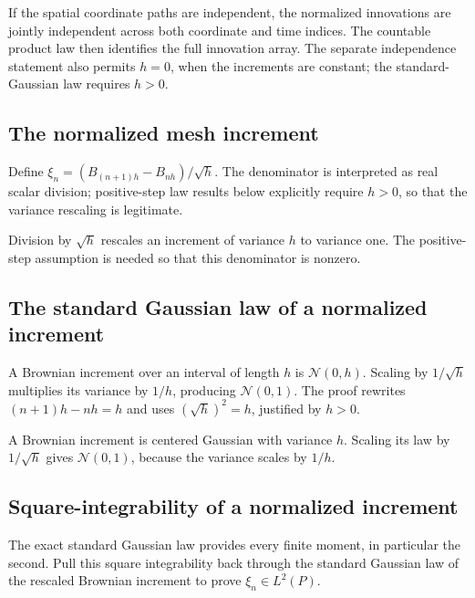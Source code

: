 \documentclass[11pt,a4paper]{report}
\begin{document}
If the spatial coordinate paths are independent, the normalized innovations are jointly independent across both coordinate and time indices. The countable product law then identifies the full innovation array. The separate independence statement also permits \(h=0\), when the increments are constant; the standard-Gaussian law requires \(h>0\).

\subsection{\texorpdfstring{The normalized mesh increment}{The normalized mesh increment}}
\label{report-step-UnadjustedLangevin-BrownianInnovations-lean-1}


Define \(\xi_n=(B_{(n+1)h}-B_{nh})/\sqrt h\). The denominator is interpreted as real scalar division; positive-step law results below explicitly require \(h>0\), so that the variance rescaling is legitimate.



Division by \(\sqrt h\) rescales an increment of variance \(h\) to variance one. The positive-step assumption is needed so that this denominator is nonzero.

\subsection{\texorpdfstring{The standard Gaussian law of a normalized increment}{The standard Gaussian law of a normalized increment}}
\label{report-step-UnadjustedLangevin-BrownianInnovations-lean-2}


A Brownian increment over an interval of length \(h\) is \(\mathcal N(0,h)\). Scaling by \(1/\sqrt h\) multiplies its variance by \(1/h\), producing \(\mathcal N(0,1)\). The proof rewrites \((n+1)h-nh=h\) and uses \((\sqrt h)^2=h\), justified by \(h>0\).



A Brownian increment is centered Gaussian with variance \(h\). Scaling its law by \(1/\sqrt h\) gives \(\mathcal N(0,1)\), because the variance scales by \(1/h\).

\subsection{\texorpdfstring{Square-integrability of a normalized increment}{Square-integrability of a normalized increment}}
\label{report-step-UnadjustedLangevin-BrownianInnovations-lean-3}


The exact standard Gaussian law provides every finite moment, in particular the second. Pull this square integrability back through the standard Gaussian law of the rescaled Brownian increment to prove \(\xi_n\in L^2(P)\).
\end{document}
